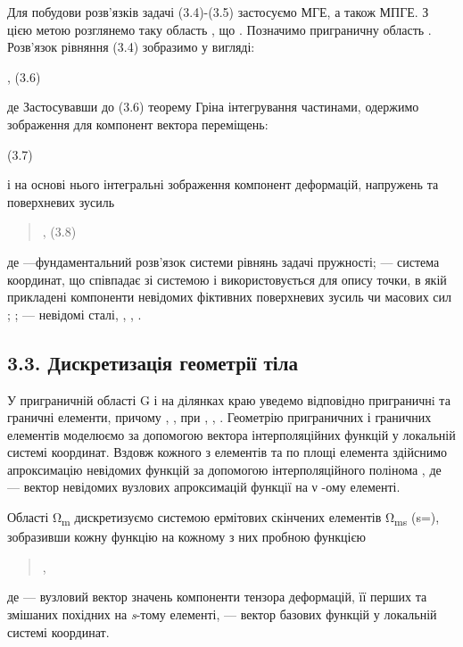 Для побудови розв'язків задачі (3.4)-(3.5) застосуємо МГЕ, а також МПГЕ.
З цією метою розглянемо таку область , що . Позначимо приграничну
область . Розв'язок рівняння (3.4) зобразимо у вигляді:

, (3.6)

де Застосувавши до (3.6) теорему Гріна інтегрування частинами, одержимо
зображення для компонент вектора переміщень:

(3.7)

і на основі нього інтегральні зображення компонент деформацій, напружень
та поверхневих зусиль

\begin{quote}
, (3.8)
\end{quote}

де ---фундаментальний розв'язок системи рівнянь задачі пружності; ---
система координат, що співпадає зі системою і використовується для опису
точки, в якій прикладені компоненти невідомих фіктивних поверхневих
зусиль чи масових сил ; ; --- невідомі сталі, , , .

\hypertarget{ux434ux438ux441ux43aux440ux435ux442ux438ux437ux430ux446ux456ux44f-ux433ux435ux43eux43cux435ux442ux440ux456ux457-ux442ux456ux43bux430}{%
\subsection{3.3. Дискретизація геометрії
тіла}\label{ux434ux438ux441ux43aux440ux435ux442ux438ux437ux430ux446ux456ux44f-ux433ux435ux43eux43cux435ux442ux440ux456ux457-ux442ux456ux43bux430}}

У приграничній області G і на ділянках краю уведемо відповідно
пригра­нич­нi та граничні елементи, при­чому , , при , , . Геометрію
приграничних і граничних елементів моделюємо за допомогою вектора
інтерполяційних функцій у локальній системі координат. Вздовж кожного з
елементів та по площі елемента здійснимо апроксимацію невідомих функцій
за допомогою інтерполяційного полінома , де --- вектор невідомих
вузлових апроксимацій функції на ν -ому елементі.

Області Ω\textsubscript{m} дискретизуємо системою ермітових скінчених
елементів Ω\textsubscript{ms} (s=), зобразивши кожну функцію на кожному
з них пробною функцією

\begin{quote}
,
\end{quote}

де --- вузловий вектор значень компоненти тензора деформацій, її перших
та змішаних похідних на \emph{s}-тому елементі, --- вектор базових
функцій у локальній системі координат.

